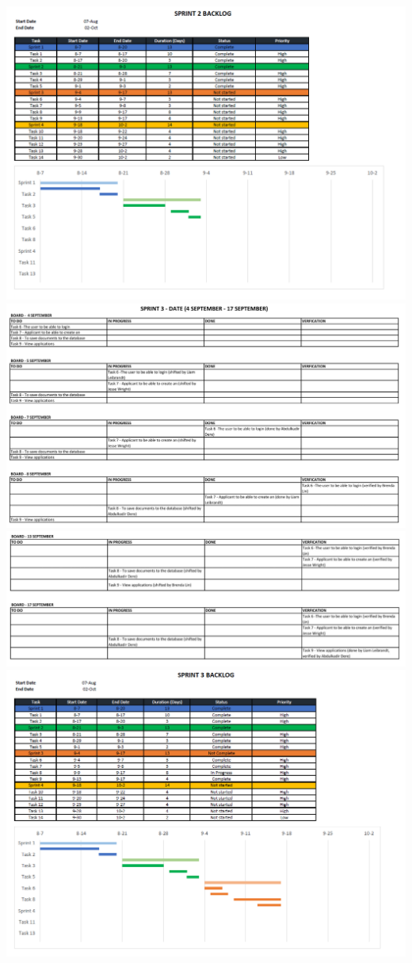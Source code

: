 \documentclass{article}
\begin{document}
\includegraphics[scale=0.65]{Sprint2Backlog.PNG}\\
\includegraphics[scale=0.5]{Sprint3a.png}\\
\includegraphics[scale=0.5]{Sprint3b.png}\\
\includegraphics[scale=0.65]{Sprint3Backlog.PNG}\\ 
\end{document}
